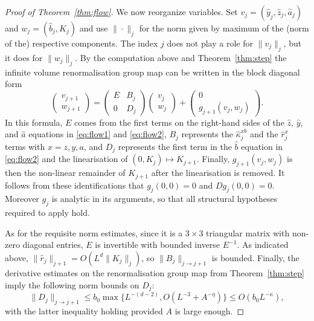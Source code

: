 \documentclass[11pt]{amsart}
\numberwithin{equation}{section}
\numberwithin{theorem}{section}
\newcommand{\1}{{\bf 1}}
\begin{document}
\begin{proof}[Proof of Theorem~\ref{thm:flow}]
  We now reorganize variables.  Set $v_j=(\hat y_j,\hat z_j,\hat a_j)$
  and $w_j=(\hat b_j,K_j)$ and use $\|\cdot\|_{j}$ for the norm
  given by maximum of the (norm of the) respective components.
  The index $j$ does not play a role for $\|v_{j}\|_{j}$, but it
  does for $\|w_{j}\|_{j}$. By the computation above and
  Theorem~\ref{thm:step} the infinite volume renormalisation group map
  can be written in the block diagonal form
  \begin{equation}\label{e:flowblock}
    \begin{pmatrix}v_{j+1} \\ w_{j+1}\end{pmatrix}
    = \begin{pmatrix} E & B_j \\ 0 & D_j \end{pmatrix}
    \begin{pmatrix}v_{j} \\ w_{j}\end{pmatrix}
    + \begin{pmatrix} 0 \\ g_{j+1}(v_j,w_j)  \end{pmatrix}.
  \end{equation}
  In this formula, $E$ comes from the first terms on the right-hand sides of the $\hat z$, $\hat y$, and $\hat a$ equations in  \eqref{eq:flow1} and \eqref{eq:flow2},
  $B_j$ represents the $\hat\kappa^{xb}_j$ and the $\hat r^x_{j}$ terms with $x=z,y,a$, and $D_j$ represents the first term in the $\hat b$ equation in \eqref{eq:flow2} and the linearisation of $(0, K_j)\mapsto K_{j+1}$.
  Finally, $g_{j+1}(v_j, w_j)$ is then the non-linear remainder of $K_{j+1}$ after the linearisation is removed.  It follows from these identifications that
  $g_j(0,0)=0$ and $Dg_j(0,0)=0$.  Moreover $g_j$ is analytic  in its arguments, so that all structural hypotheses required to apply  \cite[Theorem~2.16]{MR2523458} hold.
  
  As for the requisite norm estimates,  since it is a $3\times 3$ 
  triangular matrix with non-zero diagonal entries, $E$ is
  invertible with bounded inverse $E^{-1}$. As
  indicated above, $\|\hat{r}_j\|_{j+1}=O(L^{d}\|K_j\|_j)$,
  so $\|B_j\|_{j\to j+1}$ is bounded.   Finally,
  the derivative estimates on the renormalisation group map  from Theorem~\ref{thm:step} imply the following norm bounds on $D_j$:
  \begin{equation}
   \|D_j\|_{j\to j+1} \leq b_0 \max\{L^{-(d-2)}, O(L^{-3}+A^{-\eta})\} \leq
   O(b_0 L^{-\kappa}),
  \end{equation}
  with the latter inequality holding provided $A$ is large enough.
  

\end{proof}
\end{document}
